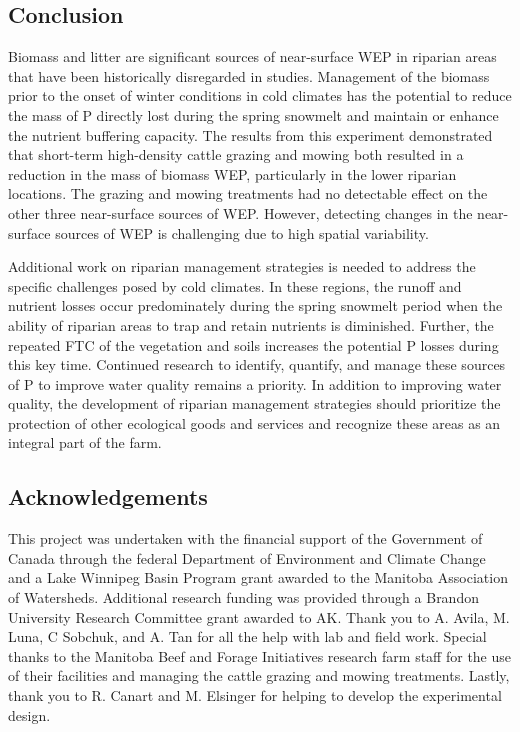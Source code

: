 \documentclass[
]{agujournal2019}
\begin{document}
\subsection{Conclusion}\label{conclusion}

Biomass and litter are significant sources of near-surface WEP in
riparian areas that have been historically disregarded in studies.
Management of the biomass prior to the onset of winter conditions in
cold climates has the potential to reduce the mass of P directly lost
during the spring snowmelt and maintain or enhance the nutrient
buffering capacity. The results from this experiment demonstrated that
short-term high-density cattle grazing and mowing both resulted in a
reduction in the mass of biomass WEP, particularly in the lower riparian
locations. The grazing and mowing treatments had no detectable effect on
the other three near-surface sources of WEP. However, detecting changes
in the near-surface sources of WEP is challenging due to high spatial
variability.

Additional work on riparian management strategies is needed to address
the specific challenges posed by cold climates. In these regions, the
runoff and nutrient losses occur predominately during the spring
snowmelt period when the ability of riparian areas to trap and retain
nutrients is diminished. Further, the repeated FTC of the vegetation and
soils increases the potential P losses during this key time. Continued
research to identify, quantify, and manage these sources of P to improve
water quality remains a priority. In addition to improving water
quality, the development of riparian management strategies should
prioritize the protection of other ecological goods and services and
recognize these areas as an integral part of the farm.

\subsection*{Acknowledgements}\label{acknowledgements}

This project was undertaken with the financial support of the Government
of Canada through the federal Department of Environment and Climate
Change and a Lake Winnipeg Basin Program grant awarded to the Manitoba
Association of Watersheds. Additional research funding was provided
through a Brandon University Research Committee grant awarded to AK.
Thank you to A. Avila, M. Luna, C Sobchuk, and A. Tan for all the help
with lab and field work. Special thanks to the Manitoba Beef and Forage
Initiatives research farm staff for the use of their facilities and
managing the cattle grazing and mowing treatments. Lastly, thank you to
R. Canart and M. Elsinger for helping to develop the experimental
design.
\end{document}

